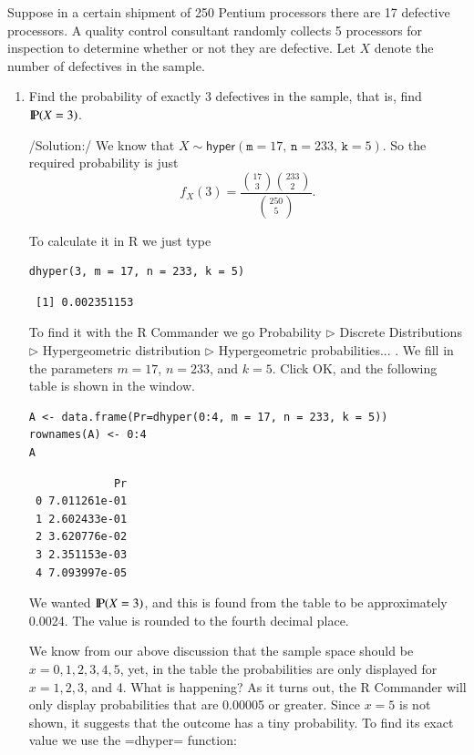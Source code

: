 \documentclass[captions=tableheading]{scrbook}
\begin{document}
\begin{example}
Suppose in a certain shipment of 250 Pentium processors there are 17 defective processors. A quality control consultant randomly collects 5 processors for inspection to determine whether or not they are defective. Let \(X\) denote the number of defectives in the sample.

\end{example}

\begin{enumerate}
\item Find the probability of exactly 3 defectives in the sample, that is,
find \(\P(X=3)\). 

/Solution:/ We know that \(X\sim\mathsf{hyper}(\mathtt{m}=17,\,\mathtt{n}=233,\,\mathtt{k}=5)\). So the required probability is just
\[
f_{X}(3)=\frac{{17 \choose 3}{233 \choose 2}}{{250 \choose 5}}.
\]

To calculate it in \textsf{R} we just type 


\begin{verbatim}
dhyper(3, m = 17, n = 233, k = 5)
\end{verbatim}

\begin{verbatim}
 [1] 0.002351153
\end{verbatim}

To find it with the \textsf{R} Commander we go \textsf{Probability} \(\triangleright\) \textsf{Discrete Distributions} \(\triangleright\) \textsf{Hypergeometric distribution} \(\triangleright\) \textsf{Hypergeometric probabilities}... . We fill in the parameters \(m=17\), \(n=233\), and \(k=5\). Click \textsf{OK}, and the following table is shown in the window.


\begin{verbatim}
A <- data.frame(Pr=dhyper(0:4, m = 17, n = 233, k = 5))
rownames(A) <- 0:4 
A
\end{verbatim}

\begin{verbatim}
             Pr
 0 7.011261e-01
 1 2.602433e-01
 2 3.620776e-02
 3 2.351153e-03
 4 7.093997e-05
\end{verbatim}

We wanted \(\P(X=3)\), and this is found from the table to be approximately 0.0024. The value is rounded to the fourth decimal place.

We know from our above discussion that the sample space should be \(x=0,1,2,3,4,5\), yet, in the table the probabilities are only displayed for \(x=1,2,3\), and 4. What is happening? As it turns out, the \textsf{R} Commander will only display probabilities that are 0.00005 or greater. Since \(x=5\) is not shown, it suggests that the outcome has a tiny probability. To find its exact value we use the =dhyper= function:



\end{enumerate}
\end{document}
